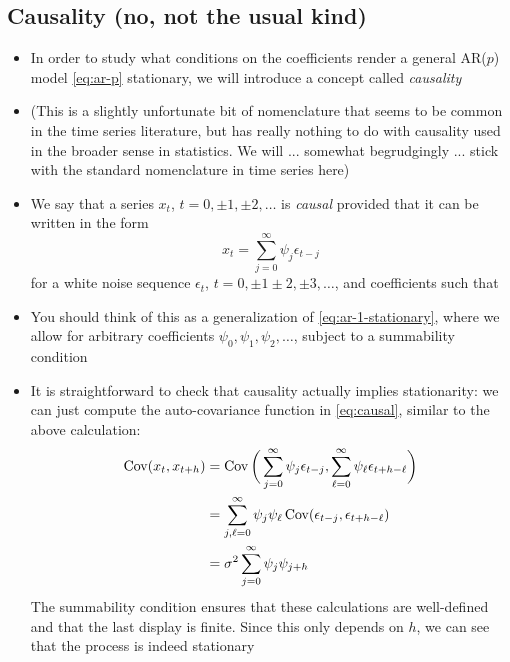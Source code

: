 \documentclass{article}
\begin{document}
\subsection{Causality (no, not the usual kind)}

\begin{itemize}
\item In order to study what conditions on the coefficients render a general
  AR($p$) model \eqref{eq:ar-p} stationary, we will introduce a concept called
  \emph{causality} 

\item (This is a slightly unfortunate bit of nomenclature that seems to be
  common in the time series literature, but has really nothing to do with
  causality used in the broader sense in statistics. We will ... somewhat
  begrudgingly ... stick with the standard nomenclature in time series here) 

\item We say that a series $x_t$, $t = 0, \pm 1, \pm 2, \dots$ is \emph{causal}
  provided that it can be written in the form
  \begin{equation}
  \label{eq:causal}
  x_t = \sum_{j=0}^\infty \psi_j \epsilon_{t-j}
  \end{equation}
  for a white noise sequence $\epsilon_t$, $t = 0, \pm 1 \pm 2, \pm
  3,\dots$, and coefficients such that 

\item You should think of this as a generalization of
  \eqref{eq:ar-1-stationary}, where we allow for arbitrary coefficients
  $\psi_0,\psi_1,\psi_2,\dots$, subject to a summability condition 

\item It is straightforward to check that causality actually implies
  stationarity: we can just compute the auto-covariance function in
  \eqref{eq:causal}, similar to the above calculation:
    \begin{align*}
  \operatorname{Cov}(x_t, x_{t+h}) &= \operatorname{Cov}\bigg( \sum_{j=0}^\infty \psi_j \epsilon_{t-j}, 
  \sum_{\ell=0}^\infty \psi_\ell \epsilon_{t+h-\ell} \bigg) \\
  &= \sum_{j,\ell=0}^\infty \psi_j \psi_\ell \operatorname{Cov}( \epsilon_{t-j},
    \epsilon_{t+h-\ell} ) \\
  &= \sigma^2 \sum_{j=0}^\infty \psi_j \psi_{j+h}
  \end{align*}
  The summability condition ensures that these calculations are well-defined and
  that the last display is finite. Since this only depends on $h$, we can see
  that the process is indeed stationary


\end{itemize}
\end{document}
